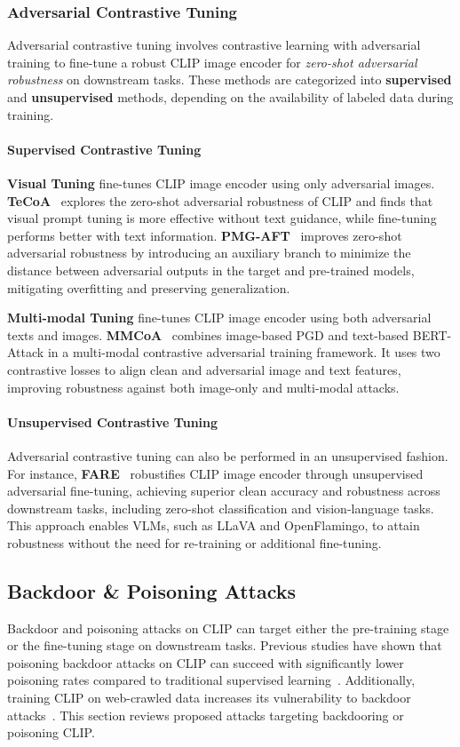 \subsubsection{Adversarial Contrastive Tuning}
Adversarial contrastive tuning involves contrastive learning with adversarial training to fine-tune a robust CLIP image encoder for \emph{zero-shot adversarial robustness} on downstream tasks. These methods are categorized into \textbf{supervised} and \textbf{unsupervised} methods, depending on the availability of labeled data during training.


\paragraph{Supervised Contrastive Tuning}
\textbf{Visual Tuning} fine-tunes CLIP image encoder using only adversarial images. \textbf{TeCoA}~\cite{mao2023understanding} explores the zero-shot adversarial robustness of CLIP and finds that visual prompt tuning is more effective without text guidance, while fine-tuning performs better with text information. \textbf{PMG-AFT}~\cite{wang2024pre} improves zero-shot adversarial robustness by introducing an auxiliary branch to minimize the distance between adversarial outputs in the target and pre-trained models, mitigating overfitting and preserving generalization.

\textbf{Multi-modal Tuning} fine-tunes CLIP image encoder using both adversarial texts and images.
\textbf{MMCoA}~\cite{zhou2024revisiting} combines image-based PGD and text-based BERT-Attack in a multi-modal contrastive adversarial training framework. It uses two contrastive losses to align clean and adversarial image and text features, improving robustness against both image-only and multi-modal attacks.

\paragraph{Unsupervised Contrastive Tuning}
Adversarial contrastive tuning can also be performed in an unsupervised fashion. For instance, \textbf{FARE}~\cite{schlarmannrobust} robustifies CLIP image encoder through unsupervised adversarial fine-tuning, achieving superior clean accuracy and robustness across downstream tasks, including zero-shot classification and vision-language tasks. This approach enables VLMs, such as LLaVA and OpenFlamingo, to attain robustness without the need for re-training or additional fine-tuning.


\subsection{Backdoor \& Poisoning Attacks}
\label{sec:vlp-bp-attacks}
Backdoor and poisoning attacks on CLIP can target either the pre-training stage or the fine-tuning stage on downstream tasks. Previous studies have shown that poisoning backdoor attacks on CLIP can succeed with significantly lower poisoning rates compared to traditional supervised learning~\cite{carlini2022poisoning}. Additionally, training CLIP on web-crawled data increases its vulnerability to backdoor attacks~\cite{carlini2024poisoning}. This section reviews proposed attacks targeting backdooring or poisoning CLIP.


